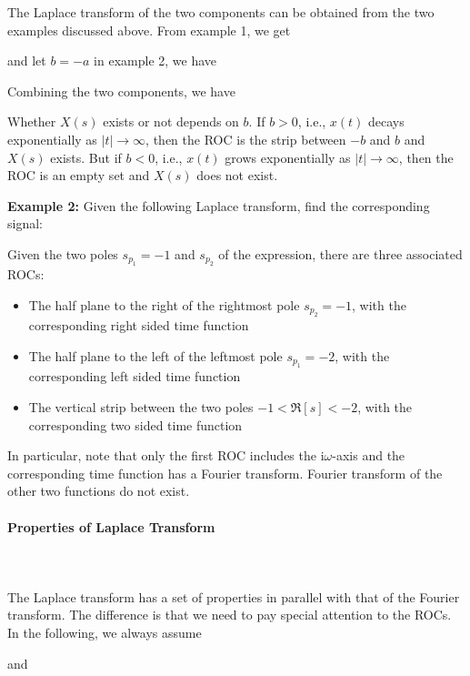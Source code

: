 	The Laplace transform of the two components can be obtained from the two examples 
	discussed above. From example 1, we get
	
	and let $b=-a$ in example 2, we have
	
	Combining the two components, we have
	
	Whether $X(s)$ exists or not depends on $b$. If $b>0$, i.e., $x(t)$ decays 
	exponentially as $|t| \rightarrow \infty$, then the ROC is the strip between $-b$
	and $b$ and $X(s)$ exists. But if $b<0$, i.e., $x(t)$ grows exponentially as 
	$|t| \rightarrow \infty$, then the ROC is an empty set and $X(s)$ does not exist.
	
	{\bf Example 2: } Given the following Laplace transform, find the corresponding 
		signal:
	
	Given the two poles $s_{p_1}=-1$ and $s_{p_2}$ of the expression, there are three 
	associated ROCs: 
	\begin{itemize}
	\item The half plane to the right of the rightmost pole $s_{p_2}=-1$, with the 
	corresponding right sided time function
		
	\item The half plane to the left of the leftmost pole $s_{p_1}=-2$, with the 
	corresponding left sided time function
		
	\item The vertical strip between the two poles $-1 < \Re[s] < -2$, with the 
		corresponding two sided time function
		 
	\end{itemize}
	In particular, note that only the first ROC includes the $\mathrm{i}\omega$-axis and the 
	corresponding time function has a Fourier transform. Fourier transform of the
	other two functions do not exist.
	
	
	\paragraph{Properties of Laplace Transform}\mbox{}\\\\
	The Laplace transform has a set of properties in parallel with that of the Fourier 
	transform. The difference is that we need to pay special attention to the ROCs. In 
	the following, we always assume
	
	and
	

